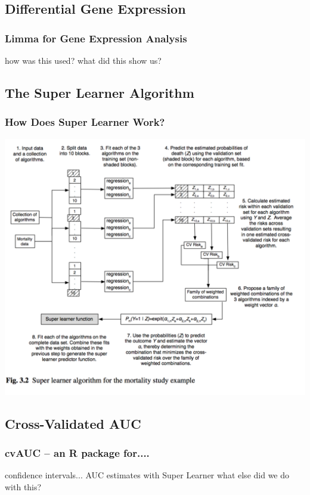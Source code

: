 \documentclass{beamer}
\begin{document}
\subsection{Differential Gene Expression}

\begin{frame}[fragile]
  	\frametitle{Limma for Gene Expression Analysis}
 		how was this used?
		what did this show us?
\end{frame}

\subsection{The Super Learner Algorithm}

\begin{frame}
	\frametitle{How Does Super Learner Work?}
		\begin{center}
    			\includegraphics[scale=0.45]{../paper/figs/SuperLearn2.png}
		\end{center}
\end{frame}

\subsection{Cross-Validated AUC}

\begin{frame}[fragile]
  	\frametitle{cvAUC -- an R package for....}
 		confidence intervals...
		AUC estimates with Super Learner
		what else did we do with this?
\end{frame}
\end{document}
